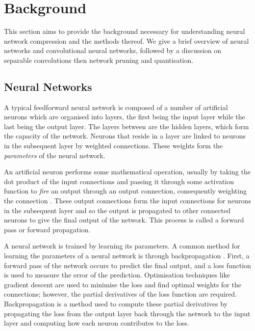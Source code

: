 \documentclass[conference]{IEEEtran}
\begin{document}
\section{Background}
This section aims to provide the background necessary for understanding neural network compression and the methods thereof. We give a brief overview of neural networks and convolutional neural networks, followed by a discussion on separable convolutions then network pruning and quantisation.

\subsection{Neural Networks}

A typical feedforward neural network is composed of a number of artificial neurons which are organised into layers, the first being the input layer while the last being the output layer. The layers between are the hidden layers, which form the capacity of the network. Neurons that reside in a layer are linked to neurons in the subsequent layer by weighted connections. These weights form the \emph{parameters} of the neural network.

An artificial neuron performs some mathematical operation, usually by taking the dot product of the input connections and passing it through some activation function to \emph{fire} an output through an output connection, consequently weighting the connection \cite{Goodfellow-et-al-2016}. These output connections form the input connections for neurons in the subsequent layer and so the output is propagated to other connected neurons to give the final output of the network. This process is called a forward pass or forward propagation.

A neural network is trained by learning its parameters. A common method for learning the parameters of a neural network is through backpropagation \cite{rumelhart1988learning}. First, a forward pass of the network occurs to predict the final output, and a loss function is used to measure the error of the prediction. Optimisation techniques like gradient descent are used to minimise the loss and find optimal weights for the connections; however, the partial derivatives of the loss function are required. Backpropagation is a method used to compute these partial derivatives by propagating the loss from the output layer back through the network to the input layer and computing how each neuron contributes to the loss.
\end{document}
